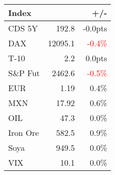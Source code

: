 \documentclass[article,crop=false]{standalone}%
\begin{document}
%
\scriptsize%
\renewcommand{\arraystretch}{1.2}%
\setlength{\tabcolsep}{0.15cm}%
\begin{tabular}{l  r  r  }%
\hline%
\textbf{Index}&\textbf{}&\textbf{+/{-}}\\%
\hline%
CDS 5Y&192.8&{-}0.0pts\\%
DAX&12095.1&\textcolor{red}{ 
{-}0.4\%
}\\%
T{-}10&2.2&0.0pts\\%
S\&P Fut&2462.6&\textcolor{red}{ 
{-}0.5\%
}\\%
EUR&1.19&0.4\%\\%
MXN&17.92&0.6\%\\%
OIL&47.3&0.0\%\\%
Iron Ore&582.5&0.9\%\\%
Soya&949.5&0.0\%\\%
VIX&10.1&0.0\%\\%
\hline%
\end{tabular}%
\end{document}
